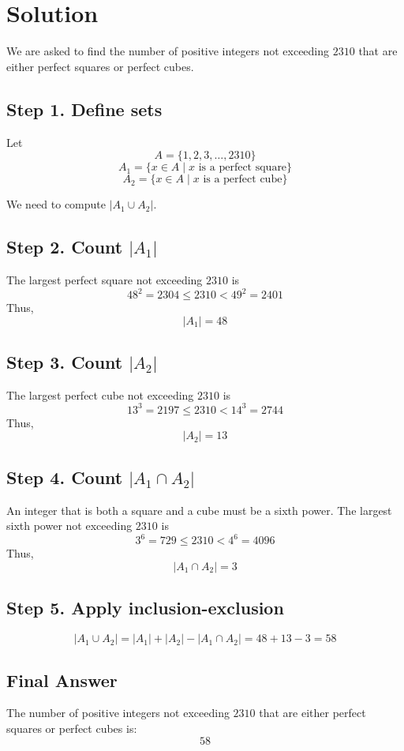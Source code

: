 \documentclass{article}
\begin{document}
\section*{Solution}

We are asked to find the number of positive integers not exceeding $2310$ that are either perfect squares or perfect cubes.

\subsection*{Step 1. Define sets}
Let 
\[
A = \{1,2,3,\dots,2310\}
\]
\[
A_1 = \{ x \in A \mid x \text{ is a perfect square} \}
\]
\[
A_2 = \{ x \in A \mid x \text{ is a perfect cube} \}
\]

We need to compute $|A_1 \cup A_2|$.

\subsection*{Step 2. Count $|A_1|$}
The largest perfect square not exceeding $2310$ is
\[
48^2 = 2304 \leq 2310 < 49^2 = 2401
\]
Thus,
\[
|A_1| = 48
\]

\subsection*{Step 3. Count $|A_2|$}
The largest perfect cube not exceeding $2310$ is
\[
13^3 = 2197 \leq 2310 < 14^3 = 2744
\]
Thus,
\[
|A_2| = 13
\]

\subsection*{Step 4. Count $|A_1 \cap A_2|$}
An integer that is both a square and a cube must be a sixth power. The largest sixth power not exceeding $2310$ is
\[
3^6 = 729 \leq 2310 < 4^6 = 4096
\]
Thus,
\[
|A_1 \cap A_2| = 3
\]

\subsection*{Step 5. Apply inclusion-exclusion}
\[
|A_1 \cup A_2| = |A_1| + |A_2| - |A_1 \cap A_2|
= 48 + 13 - 3 = 58
\]

\subsection*{Final Answer}
The number of positive integers not exceeding $2310$ that are either perfect squares or perfect cubes is:
\[
\boxed{58}
\]
\end{document}
